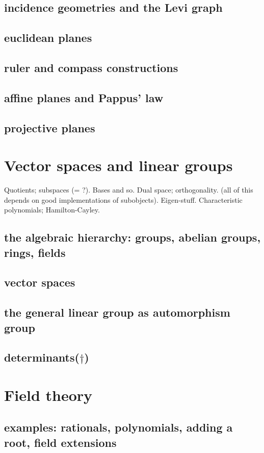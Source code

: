 \documentclass[a4,12pt]{amsbook}
\begin{document}
\section{incidence geometries and the Levi graph}
\section{euclidean planes}
\section{ruler and compass constructions}
\section{affine planes and Pappus' law}
\section{projective planes}
\chapter{Vector spaces and linear groups}
Quotients; subspaces (= ?). Bases and so. Dual space; orthogonality. (all of this depends on good implementations of subobjects). Eigen-stuff. Characteristic polynomials; Hamilton-Cayley. 
\section{the algebraic hierarchy: groups, abelian groups, rings, fields}
\section{vector spaces}
\section{the general linear group as automorphism group}
\section{determinants($\dagger$)}
\chapter{Field theory}
\section{examples: rationals, polynomials, adding a root, field extensions}
\end{document}
